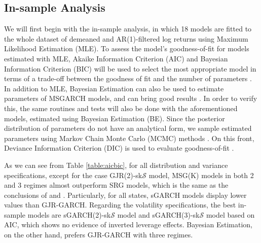 \documentclass[12pt,a4paper]{article}
\begin{document}
\subsection{In-sample Analysis}
We will first begin with the in-sample analysis, in which 18 models are fitted to the whole dataset of demeaned and AR(1)-filtered log returns using  Maximum Likelihood Estimation (MLE). To assess the model's goodness-of-fit for models estimated with MLE, Akaike Information Criterion (AIC) \citep{akaike1998information} and Bayesian Information Criterion (BIC) \citep{schwarz1978estimating} will be used to select the most appropriate model in terms of a trade-off between the goodness of fit and the number of parameters \citep{guidolin2018essentials}. In addition to MLE, Bayesian Estimation can also be used to estimate parameters of MSGARCH models, and can bring good results \citep{ardia2019regime}. In order to verify this, the same routines and tests will also be done with the aforementioned models, estimated using Bayesian Estimation (BE). Since the posterior distribution of parameters do not have an analytical form, we sample estimated parameters using Markov Chain Monte Carlo (MCMC) methods \citep{ardia2019msgarchr}. On this front, Deviance Information Criterion (DIC) is used to evaluate goodness-of-fit \citep{spiegelhalter2002bayesian}.

As we can see from Table \ref{table:aicbic}, for all distribution and variance specifications, except for the case GJR(2)-sk$\mathcal{S}$ model, MSG(K) models in both 2 and 3 regimes almost outperform SRG models, which is the same as the conclusions of \cite{ardia2019regime} and \cite{maciel2021cryptocurrencies}. Particularly, for all states, sGARCH models display lower values than GJR-GARCH. Regarding the volatility specifications, the best in-sample models are sGARCH(2)-sk$\mathcal{S}$ model and sGARCH(3)-sk$\mathcal{S}$ model based on AIC, which shows no evidence of inverted leverage effects. Bayesian Estimation, on the other hand, prefers GJR-GARCH with three regimes.\par
\end{document}
